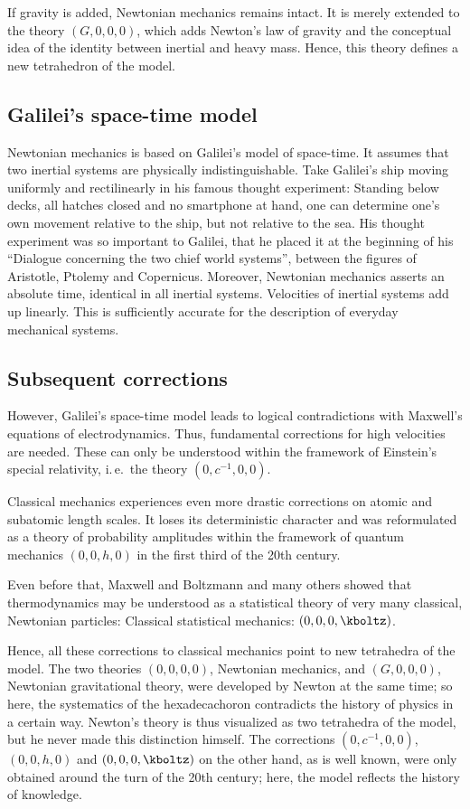 If gravity is added, Newtonian mechanics remains intact. It is merely extended to the theory $(G,0,0,0)$, which adds Newton's law of gravity and the conceptual idea of the identity between inertial and heavy mass. Hence, this theory defines a new tetrahedron of the model.


\subsection*{Galilei's space-time model}

Newtonian mechanics is based on Galilei's model of space-time. It assumes that two inertial systems are physically indistinguishable. Take Galilei's ship moving uniformly and rectilinearly in his famous thought experiment: Standing below decks, all hatches closed and no smartphone at hand, one can determine one's own movement relative to the ship, but not relative to the sea. His thought experiment was so important to Galilei, that he placed it at the beginning of his \enquote{Dialogue concerning the two chief world systems}, between the figures of Aristotle, Ptolemy and Copernicus. Moreover, Newtonian mechanics asserts an absolute time, identical in all inertial systems. Velocities of inertial systems add up linearly. This is sufficiently accurate for the description of everyday mechanical systems.


\subsection*{Subsequent corrections}

However, Galilei's space-time model leads to logical contradictions with Maxwell's equations of electrodynamics. Thus, fundamental corrections for high velocities are needed. These can only be understood within the framework of Einstein's special relativity, i.\,e.\ the theory $(0,c^{−1},0,0)$.

Classical mechanics experiences even more drastic corrections on atomic and subatomic length scales. It loses its deterministic character and was reformulated as a theory of probability amplitudes within the framework of quantum mechanics $(0,0,h,0)$ in the first third of the 20th century.

Even before that, Maxwell and Boltzmann and many others showed that thermodynamics may be understood as a statistical theory of very many classical, Newtonian particles: Classical statistical mechanics: $(0,0,0,\kboltz)$.

Hence, all these corrections to classical mechanics point to new tetrahedra of the model. The two theories $(0,0,0,0)$, Newtonian mechanics, and $(G,0,0,0)$, Newtonian gravitational theory, were developed by Newton at the same time; so here, the systematics of the hexadecachoron contradicts the history of physics in a certain way. Newton's theory is thus visualized as two tetrahedra of the model, but he never made this distinction himself. The corrections $(0,c^{−1},0,0)$, $(0,0,h,0)$ and $(0,0,0,\kboltz)$ on the other hand, as is well known, were only obtained around the turn of the 20th century; here, the model reflects the history of knowledge.
